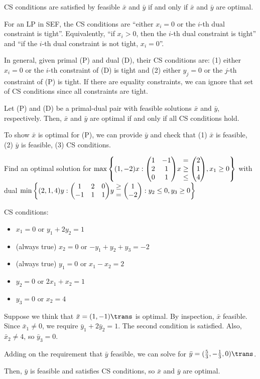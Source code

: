 CS conditions are satisfied by feasible $\bar x$ and $\bar y$ if and
only if $\bar x$ and $\bar y$ are optimal.


For an LP in SEF, the CS conditions are
``either $x_i = 0$ or the $i$-th dual constraint is tight''.
Equivalently, ``if $x_i > 0$, then the $i$-th dual constraint is tight''
and ``if the $i$-th dual constraint is not tight, $x_i = 0$''.

In general, given primal (P) and dual (D), their CS conditions are:
(1) either $x_i = 0$ or the $i$-th constraint of (D) is tight and
(2) either $y_j = 0$ or the $j$-th constraint of (P) is tight.
If there are equality constraints,
we can ignore that set of CS conditions since all constraints are tight.

\begin{theorem}
  Let (P) and (D) be a primal-dual pair with feasible solutions $\bar x$ and $\bar y$, respectively.
  Then, $\bar x$ and $\bar y$ are optimal if and only if all CS conditions hold.
\end{theorem}

To show $\bar x$ is optimal for (P), we can provide $\bar y$ and check that
(1) $\bar x$ is feasible, (2) $\bar y$ is feasible, (3) CS conditions.

\begin{example}
  Find an optimal solution for
  $\max\qty{(1,-2)x : \mqty(1&-1\\2&1\\0&1)x\mathrel{\mqty{=\\\geq\\\leq}}\mqty(2\\1\\4), x_1 \geq 0}$
  with dual
  $\min\qty{(2,1,4)y : \mqty(1&2&0\\-1&1&1)y\mathrel{\mqty{\geq\\=}}\mqty(1\\-2) : y_2 \leq 0, y_3 \geq 0}$
\end{example}
\begin{sol}
  CS conditions:
  \begin{itemize}[nosep]
    \item $x_1 = 0$ or $y_1 + 2y_2 = 1$
    \item (always true) $x_2 = 0$ or $\boxed{-y_1 + y_2 + y_3 = -2}$
    \item (always true) $y_1 = 0$ or $\boxed{x_1 - x_2 = 2}$
    \item $y_2 = 0$ or $2x_1 + x_2 = 1$
    \item $y_3 = 0$ or $x_2 = 4$
  \end{itemize}
  Suppose we think that $\bar x = (1,-1)\trans$ is optimal.
  By inspection, $\bar x$ feasible.
  Since $\bar x_1 \neq 0$, we require $\bar y_1 + 2\bar y_2 = 1$.
  The second condition is satisfied.
  Also, $\bar x_2 \neq 4$, so $\bar y_3 = 0$.

  Adding on the requirement that $\bar y$ feasible, we can solve for
  $\bar y = (\frac53, -\frac13,0)\trans$.

  Then, $\bar y$ is feasible and satisfies CS conditions, so
  $\bar x$ and $\bar y$ are optimal.
\end{sol}

